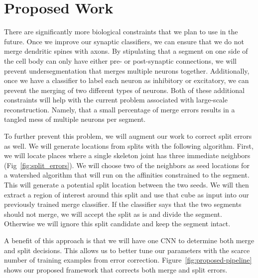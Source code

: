 \section{Proposed Work}

There are significantly more biological constraints that we plan to use in the future.
Once we improve our synaptic classifiers, we can ensure that we do not merge dendritic spines with axons. 
By stipulating that a segment on one side of the cell body can only have either pre- or post-synaptic connections, we will prevent undersegmentation that merges multiple neurons together.
Additionally, once we have a classifier to label each neuron as inhibitory or excitatory, we can prevent the merging of two different types of neurons.
Both of these additional constraints will help with the current problem associated with large-scale reconstruction.
Namely, that a small percentage of merge errors results in a tangled mess of multiple neurons per segment.

To further prevent this problem, we will augment our work to correct split errors as well.
We will generate locations from splits with the following algorithm.
First, we will locate places where a single skeleton joint has three immediate neighbors (Fig~\ref{fig:split_errors}).
We will choose two of the neighbors as seed locations for a watershed algorithm that will run on the affinities constrained to the segment.
This will generate a potential split location between the two seeds.
We will then extract a region of interest around this split and use that cube as input into our previously trained merge classifier.
If the classifier says that the two segments should not merge, we will accept the split as is and divide the segment.
Otherwise we will ignore this split candidate and keep the segment intact.

A benefit of this approach is that we will have one CNN to determine both merge and split decisions.
This allows us to better tune our parameters with the scarce number of training examples from error correction.
Figure~\ref{fig:proposed-pipeline} shows our proposed framework that corrects both merge and split errors.
